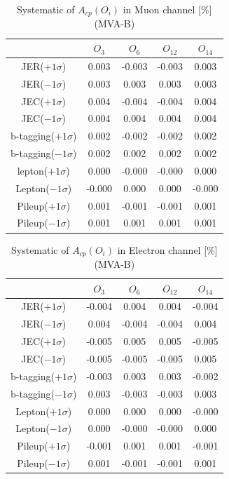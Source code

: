 		\begin{center}
		\setlength{\tabcolsep}{12pt}
		\begin{longtable}{ | c | c c c c | }
		\caption{Systematic of $A_{cp}(O_i)$ in Muon channel [\%] (MVA-B)}\\
		\hline
		 [\%] & $O_3$ & $O_6$ & $O_{12}$ & $O_{14}$ \\
		\hline
		JER($+1\sigma$) & 0.003 & -0.003 & -0.003 & 0.003 \\
		JER($-1\sigma$) & 0.003 & 0.003 & 0.003 & 0.003 \\
		\hline
		JEC($+1\sigma$) & 0.004 & -0.004 & -0.004 & 0.004 \\
		JEC($-1\sigma$) & 0.004 & 0.004 & 0.004 & 0.004 \\
		\hline
		b-tagging($+1\sigma$) & 0.002 & -0.002 & -0.002 & 0.002 \\
		b-tagging($-1\sigma$) & 0.002 & 0.002 & 0.002 & 0.002 \\
		\hline
		lepton($+1\sigma$) & 0.000 & -0.000 & -0.000 & 0.000 \\
		Lepton($-1\sigma$) & -0.000 & 0.000 & 0.000 & -0.000 \\
		\hline
		Pileup($+1\sigma$) & 0.001 & -0.001 & -0.001 & 0.001 \\
		Pileup($-1\sigma$) & 0.001 & 0.001 & 0.001 & 0.001 \\
		\hline
		\end{longtable}
		\end{center}

		\begin{center}
		\setlength{\tabcolsep}{12pt}
		\begin{longtable}{ | c | c c c c | }
		\caption{Systematic of $A_{cp}(O_i)$ in Electron channel [\%] (MVA-B)}\\
		\hline
		 [\%] & $O_3$ & $O_6$ & $O_{12}$ & $O_{14}$ \\
		\hline
		JER($+1\sigma$) & -0.004 & 0.004 & 0.004 & -0.004 \\
		JER($-1\sigma$) & 0.004 & -0.004 & -0.004 & 0.004 \\
		\hline
		JEC($+1\sigma$) & -0.005 & 0.005 & 0.005 & -0.005 \\
		JEC($-1\sigma$) & -0.005 & -0.005 & -0.005 & 0.005 \\
		\hline
		b-tagging($+1\sigma$) & -0.003 & 0.003 & 0.003 & -0.002 \\
		b-tagging($-1\sigma$) & 0.003 & -0.003 & -0.003 & 0.003 \\
		\hline
		Lepton($+1\sigma$) & 0.000 & 0.000 & 0.000 & -0.000 \\
		Lepton($-1\sigma$) & 0.000 & -0.000 & -0.000 & 0.000 \\
		\hline
		Pileup($+1\sigma$) & -0.001 & 0.001 & 0.001 & -0.001 \\
		Pileup($-1\sigma$) & 0.001 & -0.001 & -0.001 & 0.001 \\
		\hline
		\end{longtable}
		\end{center}


\FloatBarrier
